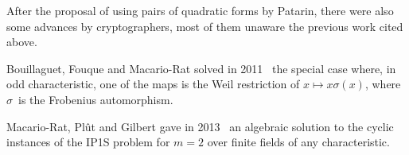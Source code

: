 \documentclass{lms}
\def\F{\mathbb{F}}
\begin{document}
% 
After the proposal of using pairs of quadratic forms by Patarin,
there were also some advances by cryptographers,
most of them unaware the previous work cited above.

Bouillaguet, Fouque and Macario-Rat solved
in 2011~\cite{DBLP:conf/asiacrypt/BouillaguetFM11}
the special case where, in odd characteristic,
one of the maps is the Weil restriction of $x ↦ x σ(x)$,
where $σ$~is the Frobenius automorphism.

Macario-Rat, Plût and Gilbert gave in 2013~\cite{MPG2013}
an algebraic solution to the cyclic instances of the IP1S problem
for $m=2$ over finite fields of any characteristic.
\end{document}
